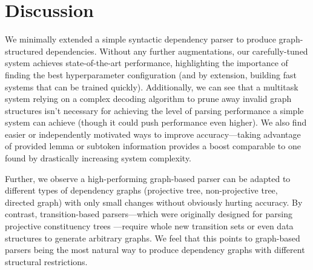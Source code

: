\documentclass[11pt,a4paper]{article}
\begin{document}
\section{Discussion}
We minimally extended a simple syntactic dependency parser to produce graph-structured dependencies. Without any further augmentations, our carefully-tuned system achieves state-of-the-art performance, highlighting the importance of finding the best hyperparameter configuration (and by extension, building fast systems that can be trained quickly). Additionally, we can see that a multitask system relying on a complex decoding algorithm to prune away invalid graph structures isn't necessary for achieving the level of parsing performance a simple system can achieve (though it could push performance even higher). We also find easier or independently motivated ways to improve accuracy---taking advantage of provided lemma or subtoken information provides a boost comparable to one found by drastically increasing system complexity. 

Further, we observe a high-performing graph-based parser can be adapted to different types of dependency graphs (projective tree, non-projective tree, directed graph) with only small changes without obviously hurting accuracy. By contrast, transition-based parsers---which were originally designed for parsing projective constituency trees \citep{Nivre2003,AhoUllman1972}---require whole new transition sets or even data structures to generate arbitrary graphs. We feel that this points to graph-based parsers being the most natural way to produce dependency graphs with different structural restrictions.



\end{document}
